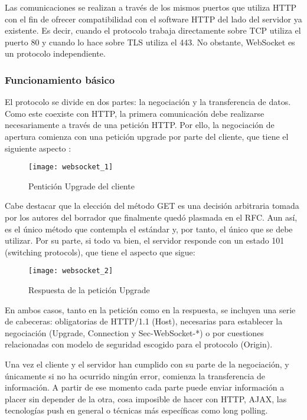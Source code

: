 Las comunicaciones se realizan a través de los mismos puertos que utiliza HTTP con el fin de ofrecer compatibilidad con el software HTTP del lado del servidor ya existente. Es decir, cuando el protocolo trabaja directamente sobre TCP utiliza el puerto 80 y cuando lo hace sobre TLS utiliza el 443. No obstante, WebSocket es un protocolo independiente.

\subsubsection{Funcionamiento básico}

El protocolo se divide en dos partes: la negociación y la transferencia de datos. Como este coexiste con HTTP, la primera comunicación debe realizarse necesariamente a través de una petición HTTP. Por ello, la negociación de apertura comienza con una petición upgrade por parte del cliente, que tiene el siguiente aspecto \cite{ws1}:

\begin{figure}[htp!]
  \centering
  \texttt{[image: websocket\_1]}
  \caption{Pentición Upgrade del cliente}
  \label{fig:websocket_1}
\end{figure}

Cabe destacar que la elección del método GET es una decisión arbitraria tomada por los autores del borrador que finalmente quedó plasmada en el RFC. Aun así, es el único método que contempla el estándar y, por tanto, el único que se debe utilizar. Por su parte, si todo va bien, el servidor responde con un estado 101 (switching protocols), que tiene el aspecto que sigue:

\begin{figure}[htp!]
  \centering
  \texttt{[image: websocket\_2]}
  \caption{Respuesta de la petición Upgrade}
  \label{fig:websocket_2}
\end{figure}

En ambos casos, tanto en la petición como en la respuesta, se incluyen una serie de cabeceras: obligatorias de HTTP/1.1 (Host), necesarias para establecer la negociación (Upgrade, Connection y Sec-WebSocket-*) o por cuestiones relacionadas con modelo de seguridad escogido para el protocolo (Origin).

Una vez el cliente y el servidor han cumplido con su parte de la negociación, y únicamente si no ha ocurrido ningún error, comienza la transferencia de información. A partir de ese momento cada parte puede enviar información a placer sin depender de la otra, cosa imposible de hacer con HTTP, AJAX, las tecnologías push en general o técnicas más específicas como long polling.


